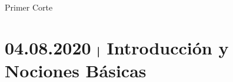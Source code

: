 \documentclass[a4paper]{book}
\begin{document}
    \titPag
    \tableofcontents



    \begin{chapter}{Primer Corte}
    \label{chap:primer_corte}

    \section{04.08.2020 $\mybar$ Introducción y Nociones Básicas}
    \label{sec:introduccion_y_nociones_basicas}





























    \end{chapter}




    \printbibliography
\end{document}
